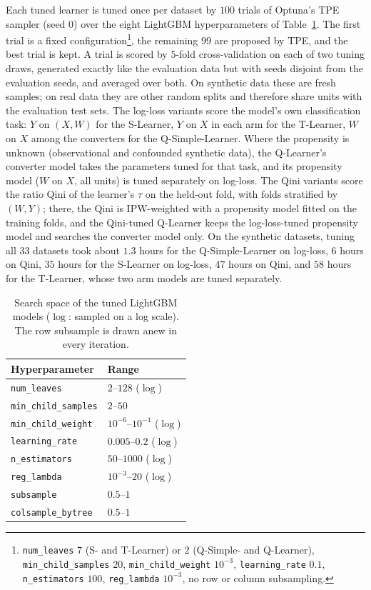 \documentclass{article}
\begin{document}
Each tuned learner is tuned once per dataset by $100$ trials of Optuna's TPE
sampler (seed $0$) over the eight LightGBM hyperparameters of
Table~\ref{tab:app-search-space}. The first trial is a fixed
configuration\footnote{\texttt{num\_leaves} $7$ (S- and T-Learner) or $2$
(Q-Simple- and Q-Learner), \texttt{min\_child\_samples} $20$,
\texttt{min\_child\_weight} $10^{-3}$, \texttt{learning\_rate} $0.1$,
\texttt{n\_estimators} $100$, \texttt{reg\_lambda} $10^{-3}$, no row or
column subsampling.}, the remaining $99$ are proposed by TPE, and the best
trial is kept.
A trial is scored by $5$-fold cross-validation on each of two tuning draws,
generated exactly like the evaluation data but with seeds disjoint from the
evaluation seeds, and averaged over both. On synthetic data these are fresh
samples; on real data they are other random splits and therefore share units
with the evaluation test sets. The log-loss variants score the
model's own classification task: $Y$ on $(X, W)$ for the S-Learner, $Y$ on $X$ in
each arm for the T-Learner, $W$ on $X$ among the converters for the
Q-Simple-Learner. Where the propensity is unknown (observational and
confounded synthetic data), the Q-Learner's converter model takes the parameters tuned for that task, and its
propensity model ($W$ on $X$, all units) is tuned separately on log-loss. The
Qini variants score the ratio Qini of the learner's $\hat\tau$ on the
held-out fold, with folds stratified by $(W, Y)$; there, the
Qini is IPW-weighted with a propensity model fitted on the training folds, and
the Qini-tuned Q-Learner keeps the log-loss-tuned propensity model and searches
the converter model only.
On the synthetic datasets, tuning all $33$ datasets took about $1.3$ hours for
the Q-Simple-Learner on log-loss, $6$ hours on Qini, $35$ hours for the
S-Learner on log-loss, $47$ hours on Qini, and $58$ hours for the T-Learner,
whose two arm models are tuned separately.

\begin{table}[H]
\centering
\caption{Search space of the tuned LightGBM models ($\log$: sampled on a log
scale). The row subsample is drawn anew in every iteration.}
\label{tab:app-search-space}
\footnotesize
\begin{tabular}{ll}
\toprule
Hyperparameter & Range \\
\midrule
\texttt{num\_leaves} & $2$--$128$ ($\log$) \\
\texttt{min\_child\_samples} & $2$--$50$ \\
\texttt{min\_child\_weight} & $10^{-6}$--$10^{-1}$ ($\log$) \\
\texttt{learning\_rate} & $0.005$--$0.2$ ($\log$) \\
\texttt{n\_estimators} & $50$--$1000$ ($\log$) \\
\texttt{reg\_lambda} & $10^{-3}$--$20$ ($\log$) \\
\texttt{subsample} & $0.5$--$1$ \\
\texttt{colsample\_bytree} & $0.5$--$1$ \\
\bottomrule
\end{tabular}
\end{table}
\end{document}
